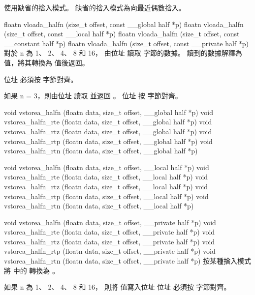  使用缺省的捨入模式。
缺省的捨入模式為向最近偶數捨入。
\stopbuffer

floatn vloada_halfn (size_t offset,
	const __global half *p)
floatn vloada_halfn (size_t offset,
	const __local half *p)
floatn vloada_halfn (size_t offset,
	const __constant half *p)
floatn vloada_halfn (size_t offset,
	const __private half *p)
\stopbuffer
{}
對於 n 為 1、 2、 4、 8 和 16，
由位址  讀取
  字節的數據。
讀到的數據解釋為  值，將其轉換為  值後返回。

位址  必須按
  字節對齊。

如果 n = 3，則由位址  讀取
  並返回 。
位址  按
  字節對齊。
\stopbuffer

void vstorea_halfn (floatn data,
	size_t offset,
	__global half *p)
void vstorea_halfn_rte (floatn data,
	size_t offset,
	__global half *p)
void vstorea_halfn_rtz (floatn data,
	size_t offset,
	__global half *p)
void vstorea_halfn_rtp (floatn data,
	size_t offset,
	__global half *p)
void vstorea_halfn_rtn (floatn data,
	size_t offset,
	__global half *p)

void vstorea_halfn (floatn data,
	size_t offset,
	__local half *p)
void vstorea_halfn_rte (floatn data,
	size_t offset,
	__local half *p)
void vstorea_halfn_rtz (floatn data,
	size_t offset,
	__local half *p)
void vstorea_halfn_rtp (floatn data,
	size_t offset,
	__local half *p)
void vstorea_halfn_rtn (floatn data,
	size_t offset,
	__local half *p)

void vstorea_halfn (floatn data,
	size_t offset,
	__private half *p)
void vstorea_halfn_rte (floatn data,
	size_t offset,
	__private half *p)
void vstorea_halfn_rtz (floatn data,
	size_t offset,
	__private half *p)
void vstorea_halfn_rtp (floatn data,
	size_t offset,
	__private half *p)
void vstorea_halfn_rtn (floatn data,
	size_t offset,
	__private half *p)
\stopbuffer
{}
按某種捨入模式將  中的  轉換為 。

如果 n 為 1、 2、 4、 8 和 16，
則將  值寫入位址 
位址  必須按
  字節對齊。

